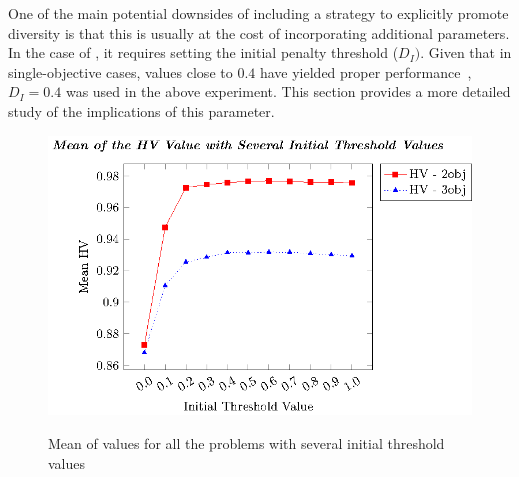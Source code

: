 One of the main potential downsides of including a strategy to explicitly promote diversity 
is that this is usually at the cost of incorporating additional parameters.
%
In the case of \AVSDMOEAD{}, it requires setting the initial penalty threshold ($D_I)$.
%
Given that in single-objective cases, values close to $0.4$ have yielded proper performance~\cite{romero2018memetic,castillo2019differential},
$D_I = 0.4$ was used in the above experiment.
%
This section provides a more detailed study of the implications of this parameter.
%
\begin{figure}[t]
\centering
\includegraphics[scale=0.9]{images/Graphic-Initial-Distance_tikz-figure0.eps} \\
\caption{Mean of \HV{} values for all the problems with several initial threshold values}\label{fig:Initial-distance-factor}
\end{figure}


